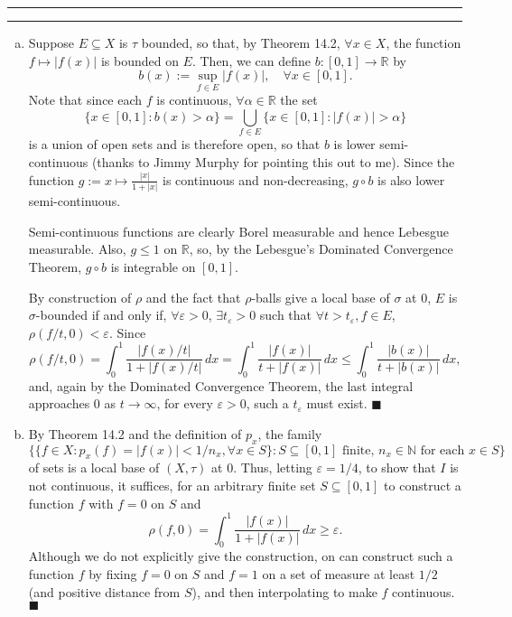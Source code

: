 \documentclass[11pt]{article}
\newcounter{questionCounter}
\newcounter{partCounter}[questionCounter]
\newenvironment{question}[2][\arabic{questionCounter}]{%
    \setcounter{partCounter}{0}%
    \vspace{.25in} \hrule \vspace{0.5em}%
        \noindent{\bf #2}%
    \vspace{0.8em} \hrule \vspace{.10in}%
    \addtocounter{questionCounter}{1}%
}{}
\renewcommand{\qed}{\quad $\blacksquare$}
\newcommand{\N}{\mathbb{N}} %
\newcommand{\R}{\mathbb{R}} %
\newcommand{\e}{\varepsilon} %
\begin{document}
\newpage
\begin{question}{Problem 3}
\begin{enumerate}[(a)]
\item Suppose $E \subseteq X$ is $\tau$ bounded, so that, by Theorem 14.2,
$\forall x \in X$, the function $f \mapsto |f(x)|$ is bounded on $E$. Then,
we can define $b : [0,1] \to \R$ by
\[b(x) := \sup_{f \in E} |f(x)|, \quad \forall x \in [0,1].\]
Note that since each $f$ is continuous, $\forall \alpha \in \R$ the set
\[\{x \in [0,1] : b(x) > \alpha\}
    = \bigcup_{f \in E} \{x \in [0,1] : |f(x)| > \alpha\}\]
is a union of open sets and is therefore open, so that $b$ is lower
semi-continuous (thanks to Jimmy Murphy for pointing this out to me).
Since the function $g := x \mapsto \frac{|x|}{1 + |x|}$ is continuous and
non-decreasing, $g \circ b$ is also lower semi-continuous.

Semi-continuous functions are clearly Borel measurable and hence Lebesgue
measurable. Also, $g \leq 1$ on $\R$, so, by the Lebesgue's
Dominated Convergence Theorem, $g \circ b$ is integrable on $[0,1]$.

By construction of $\rho$ and the fact that $\rho$-balls give a local base of
$\sigma$ at $0$, $E$ is $\sigma$-bounded if and only if, $\forall \e > 0$,
$\exists t_\e > 0$ such that $\forall t > t_\e, f \in E$,
$\rho(f/t,0) < \e$. Since
\[\rho(f/t,0)
    = \int_0^1 \frac{|f(x)/t|}{1 + |f(x)/t|} \, dx
    = \int_0^1 \frac{|f(x)|}{t + |f(x)|} \, dx
    \leq \int_0^1 \frac{|b(x)|}{t + |b(x)|} \, dx,
\]
and, again by the Dominated Convergence Theorem, the last integral approaches
$0$ as $t \to \infty$, for every $\e > 0$, such a $t_\e$ must exist. \qed

\item 
By Theorem 14.2 and the definition of $p_x$, the family
\[\{\{f \in X : p_x(f) = |f(x)| < 1/n_x, \forall x \in S\}
    : S \subseteq [0,1] \mbox{ finite, }
        n_x \in \N \mbox{ for each } x \in S\}\]
of sets is a local base of $(X,\tau)$ at $0$. Thus, letting $\e = 1/4$, to show
that $I$ is not continuous, it suffices, for an arbitrary finite set
$S \subseteq [0,1]$ to construct a function $f$ with $f = 0$ on $S$ and
\[\rho(f,0)
    = \int_0^1 \frac{|f(x)|}{1 + |f(x)|} \, dx \geq \e.\]
Although we do not explicitly give the construction, on can construct such a
function $f$ by fixing $f = 0$ on $S$ and $f = 1$ on a set of measure at least
$1/2$ (and positive distance from $S$), and then interpolating to make $f$
continuous. \qed
\end{enumerate}
\end{question}
\end{document}
